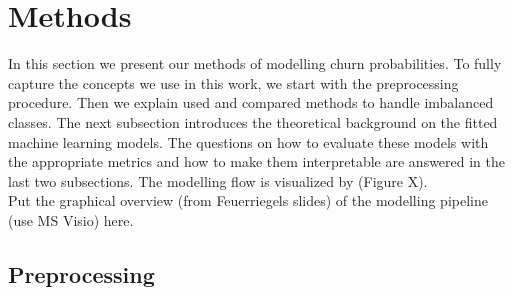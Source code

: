 \documentclass[12pt,titlepage]{article}
\begin{document}
\section{Methods} \par

In this section we present our methods of modelling churn probabilities. To fully capture the concepts we use in this work, we start with the preprocessing procedure. Then we explain used and compared methods to handle imbalanced classes. The next subsection introduces the theoretical background on the fitted machine learning models. The questions on how to evaluate these models with the appropriate metrics and how to make them interpretable are answered in the last two subsections. The modelling flow is visualized by (Figure X). \\
Put the graphical overview (from Feuerriegels slides) of the modelling pipeline (use MS Visio) here. \\

\subsection{Preprocessing} \par
\end{document}
